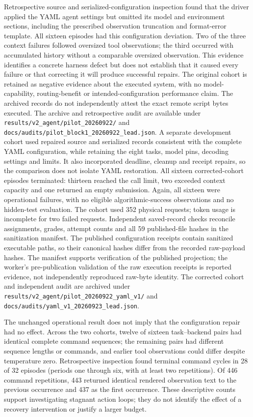Retrospective source and serialized-configuration inspection found that the driver applied the YAML
agent settings but omitted its model and environment sections, including the prescribed observation truncation and
format-error template. All sixteen episodes had this configuration deviation. Two of the three context
failures followed oversized tool observations; the third occurred with accumulated history without
a comparable oversized observation. This evidence identifies a concrete harness defect but does not
establish that it caused every failure or that correcting it will produce successful repairs.
The original cohort is retained as negative evidence about the executed system, with no model-capability,
routing-benefit or intended-configuration performance claim. The archived records do not independently
attest the exact remote script bytes executed. The archive and retrospective audit are available under
\texttt{results/v2\_agent/pilot\_20260922/} and
\texttt{docs/audits/pilot\_block1\_20260922\_lead.json}.
A separate development cohort used repaired source and serialized records consistent with the complete
YAML configuration, while retaining the eight tasks, model pins, decoding settings and limits.
It also incorporated deadline, cleanup and receipt repairs, so the comparison does not isolate YAML
restoration. All sixteen corrected-cohort episodes terminated: thirteen
reached the call limit, two exceeded context capacity and one returned an empty submission. Again,
all sixteen were operational failures, with no eligible algorithmic-success observations and no
hidden-test evaluation. The cohort used 352 physical requests; token usage is incomplete for two
failed requests. Independent saved-record checks reconcile assignments, grades, attempt counts and
all 59 published-file hashes in the sanitization manifest. The published configuration receipts contain
sanitized executable paths, so their canonical hashes differ from the recorded raw-payload hashes.
The manifest supports verification of the published projection; the worker's pre-publication validation
of the raw execution receipts is reported evidence, not independently reproduced raw-byte identity.
The corrected cohort and independent audit are archived under
\texttt{results/v2\_agent/pilot\_20260922\_yaml\_v1/} and
\texttt{docs/audits/yaml\_v1\_20260923\_lead.json}.

The unchanged operational result does not imply that the configuration repair had no effect.
Across the two cohorts, twelve of sixteen task--backend pairs had identical complete command sequences;
the remaining pairs had different sequence lengths or commands, and earlier tool observations could
differ despite temperature zero. Retrospective inspection found terminal command cycles in 28 of 32
episodes (periods one through six, with at least two repetitions). Of 446 command repetitions,
443 returned identical rendered observation text to the previous occurrence
and 437 as the first occurrence. These descriptive counts support investigating stagnant action loops;
they do not identify the effect of a recovery intervention or justify a larger budget.

